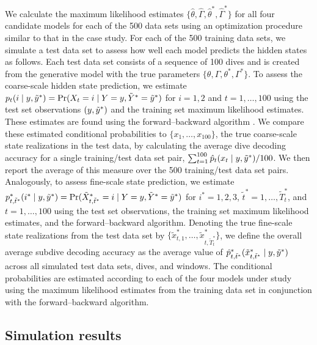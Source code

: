 We calculate the maximum likelihood estimates $\{\hat \theta, \hat \Gamma, \hat \theta^*, \hat \Gamma^*\}$ for all four candidate models for each of the 500 data sets using an optimization procedure similar to that in the case study.
%
For each of the 500 training data sets, we simulate a test data set to assess how well each model predicts the hidden states as follows. Each test data set consists of a sequence of 100 dives and is created from the generative model with the true parameters $\{\theta, \Gamma, \theta^*, \Gamma^*\}$. To assess the coarse-scale hidden state prediction, we estimate $p_t(i \mid y,\tilde{y}^*) = \Pr(X_t=i \mid Y=y,\tilde{Y}^*=\tilde{y}^*)$ for $i=1,2$ and $t=1,\ldots,100$ using the test set observations $(y,\tilde{y}^*)$ and the training set maximum likelihood estimates. These estimates are found using the forward--backward algorithm \citep{Zucchini:2016}. We compare these estimated conditional probabilities to $\{x_1,\ldots,x_{100}\}$, the true coarse-scale state realizations in the test data, by calculating the average dive decoding accuracy for a single training/test data set pair, $\sum_{t=1}^{100} \hat{p}_t(x_t \mid y,\tilde{y}^*)/100$. We then report the average of this measure over the 500 training/test data set pairs. 
Analogously, to assess fine-scale state prediction, we estimate $p^*_{t,\tilde t^*}(i^* \mid y,\tilde{y}^*) = \Pr(\tilde X^*_{t,\tilde t^*}=i \mid Y=y,\tilde{Y}^*=\tilde{y}^*)$ for $i^*=1,2,3$, $\tilde t^* = 1,\ldots,\tilde T^*_t$, and $t=1,\ldots,100$ using the test set observations, the training set maximum likelihood estimates, and the forward--backward algorithm. Denoting the true fine-scale state realizations from the test data set by $\{\tilde x^*_{t,1},\ldots,\tilde x^*_{t,\tilde T^*_t}\}$, we define the overall average subdive decoding accuracy as the average value of $\hat{p}^*_{t,\tilde t^*}(\tilde x^*_{t,\tilde t^*} \mid y,\tilde{y}^*)$ across all simulated test data sets, dives, and windows. The conditional probabilities are estimated according to each of the four models under study using the maximum likelihood estimates from the training data set in conjunction with the forward--backward algorithm.

\subsection{Simulation results}

